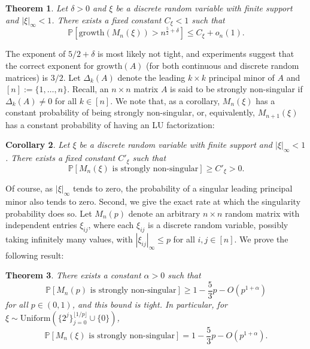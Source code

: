 \documentclass[reqno]{amsart}
\numberwithin{equation}{section}
\newtheorem{theorem}{Theorem}[section]
\newtheorem{corollary}[theorem]{Corollary}
\begin{document}
\begin{theorem}\label{thm:main}
Let $\delta >0$ and $\xi$ be a discrete random variable with finite support and $|\xi|_{\infty}<1$. There exists a fixed constant $C_{\xi}<1$ such that
\[ \mathbb{P}\left[\mathrm{growth}(M_{n}(\xi)) > n^{\frac{5}{2} + \delta} \right] \le C_{\xi} + o_{n}(1).\]
\end{theorem}

The exponent of $5/2 + \delta$ is most likely not tight, and experiments suggest that the correct exponent for $\mathrm{growth}(A)$ (for both continuous and discrete random matrices) is $3/2$. Let $\Delta_k(A)$ denote the leading $k \times k$ principal minor of $A$ and $[n]:=\{1,\ldots,n\}$. Recall, an $n \times n$ matrix $A$ is said to be strongly non-singular if $\Delta_k(A) \ne 0$ for all $k \in [n]$. We note that, as a corollary, $M_n(\xi)$ has a constant probability of being strongly non-singular, or, equivalently, $M_{n+1}(\xi)$ has a constant probability of having an LU factorization:

\begin{corollary}\label{corr:main}
Let $\xi$ be a discrete random variable with finite support and $|\xi|_{\infty}<1$. There exists a fixed constant $C'_{\xi}$ such that
\[\mathbb{P}\left[M_n(\xi) \text{ is strongly non-singular}\right] \ge C'_{\xi} >0.\]
\end{corollary}

Of course, as $|\xi|_{\infty}$ tends to zero, the probability of a singular leading principal minor also tends to zero. Second, we give the exact rate at which the singularity probability does so. Let $M_n(p)$ denote an arbitrary $n \times n$ random matrix with independent entries $\xi_{ij}$, where each $\xi_{ij}$ is a discrete random variable, possibly taking infinitely many values, with $|\xi_{ij}|_\infty\le p$ for all $i,j \in [n]$. We prove the following result:

\begin{theorem}\label{thm:p_small}
There exists a constant $\alpha>0$ such that
\[\mathbb{P}\left[M_n(p) \text{ is strongly non-singular} \right] \ge 1 - \frac{5}{3} p - O(p^{1+\alpha})\]
for all $p \in (0,1)$, and this bound is tight. In particular, for $\xi \sim \mathrm{Uniform}(\{2^j\}_{j=0}^{\lfloor1/p\rfloor} \cup \{0\})$,
\[\mathbb{P}\left[M_n(\xi) \text{ is strongly non-singular} \right] = 1 - \frac{5}{3} p - O(p^{1+\alpha}).\]
\end{theorem}
\end{document}
